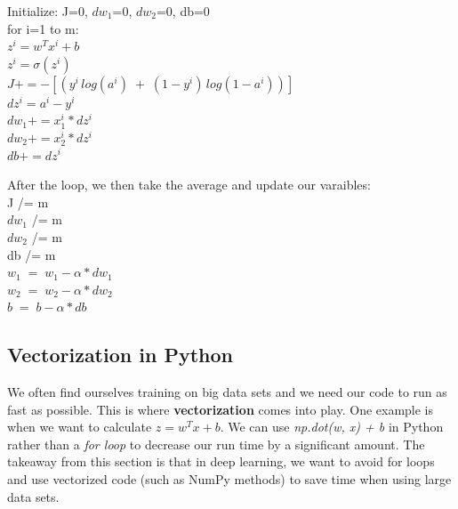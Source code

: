 \documentclass[11pt, a4paper]{article}
\begin{document}
\begin{spacing}{1.1}
\begin{minipage}[c]{8cm}
	Initialize: J=0, $dw_1$=0, $dw_2$=0, db=0 \\
	for i=1 to m: \\
	\hspace*{2mm} $z^i = w^Tx^i+b$\\
	\hspace*{2mm} $z^i = \sigma(z^i)$\\
	\hspace*{2mm} $J+= -[(y^i\,log(a^i) \; + \; (1-y^i)\,log(1-a^i))]$\\
	\hspace*{2mm} $dz^i = a^i - y^i$\\
	\hspace*{2mm} $dw_1 += x_1^i*dz^i$\\
	\hspace*{2mm} $dw_2 += x_2^i*dz^i$\\
	\hspace*{2mm} $db += dz^i$
	\end{minipage}
	\begin{minipage}[c]{8cm}
	\vspace*{2mm}
	After the loop, we then take the average and update our varaibles: \vspace*{1mm} \\
	J /= m \\
	$dw_1$ /= m \\
	$dw_2$ /= m \\
	db /= m \vspace*{1mm} \\
	$w_1 \; = \; w_1 - \alpha* dw_1$ \\
	$w_2 \; = \; w_2 - \alpha* dw_2$\\
	 $b \; = \; b - \alpha* db$
	\end{minipage} \newpage

	\subsection{Vectorization in Python}
	We often find ourselves training on big data sets and we need our code to run as fast as possible. This is where \textbf{vectorization} comes into play. One example is when we want to calculate $ z = w^Tx + b$. We can use \textit{np.dot(w, x) + b} in Python rather than a \textit{for loop} to decrease our run time by a significant amount. The takeaway from this section is that in deep learning, we want to avoid for loops and use vectorized code (such as NumPy methods) to save time when using large data sets. 

\end{spacing}
\end{document}
